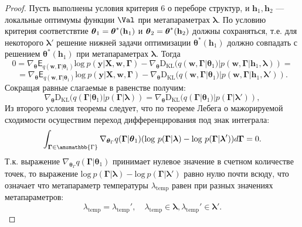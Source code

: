 \begin{proof}
Пусть выполнены условия критерия 6 о переборе структур, и $\mathbf{h}_1, \mathbf{h}_2$ --- локальные оптимумы функции $\Val$ при метапараметрах $\boldsymbol{\lambda}$.
По условию критерия соответствтие $\boldsymbol{\theta}_1 = \boldsymbol{\theta}^{*}(\mathbf{h}_1)$ и $\boldsymbol{\theta}_2 = \boldsymbol{\theta}^{*}(\mathbf{h}_2)$ должны сохраняться, т.е. для некоторого $\boldsymbol{\lambda}'$ решение  нижней задачи оптимизации $\boldsymbol{\theta}^{*}(\mathbf{h}_1)$ должно совпадать с решением $\boldsymbol{\theta}^{*}(\mathbf{h}_1)$ при метапараметрах $\boldsymbol{\lambda}$. Тогда
\[
  0 =  \nabla_{\boldsymbol{\theta}} \mathsf{E}_{q(\mathbf{w}, \boldsymbol{\Gamma}|\boldsymbol{\theta}_1)} \text{log}~p(\mathbf{y}|\mathbf{X}, \mathbf{w}, \boldsymbol{\Gamma}) -\nabla_{\boldsymbol{\theta}}  \text{D}_{\text{KL}}(q(\mathbf{w}, \boldsymbol{\Gamma}|\boldsymbol{\theta}_1) | p(\mathbf{w}, \boldsymbol{\Gamma}|\mathbf{h}_1, \boldsymbol{\lambda})) = 
\]
\[
= \nabla_{\boldsymbol{\theta}} \mathsf{E}_{q(\mathbf{w}, \boldsymbol{\Gamma}|\boldsymbol{\theta}_1)} \text{log}~p(\mathbf{y}|\mathbf{X}, \mathbf{w}, \boldsymbol{\Gamma}) - \nabla_{\boldsymbol{\theta}}  \text{D}_{\text{KL}}(q(\mathbf{w}, \boldsymbol{\Gamma}|\boldsymbol{\theta}_1) | p(\mathbf{w}, \boldsymbol{\Gamma}|\mathbf{h}_1, \boldsymbol{\lambda}')).
\]
Сокращая равные слагаемые в равенстве получим:
\[
\nabla_{\boldsymbol{\theta}}  \text{D}_{\text{KL}}(q(\boldsymbol{\Gamma}|\boldsymbol{\theta}_1) | p(\boldsymbol{\Gamma}| \boldsymbol{\lambda})) = \nabla_{\boldsymbol{\theta}} \text{D}_{\text{KL}}(q(\boldsymbol{\Gamma}|\boldsymbol{\theta}_1) | p(\boldsymbol{\Gamma}| \boldsymbol{\lambda}')),
\] 
Из второго условия теоремы следует, что по теореме Лебега о мажорируемой сходимости осуществим переход дифференцирования под знак интеграла:
\[
\int_{\boldsymbol{\Gamma} \in \amsmathbb{\Gamma}} \nabla_{\boldsymbol{\theta}_\Gamma} q(\boldsymbol{\Gamma}|\boldsymbol{\theta}_1) (\text{log}~p(\boldsymbol{\Gamma}| \boldsymbol{\lambda}) - \text{log}~p(\boldsymbol{\Gamma}| \boldsymbol{\lambda}')) d\boldsymbol{\Gamma} = 0.
\]
Т.к. выражение $ \nabla_{\boldsymbol{\theta}_\Gamma} q(\boldsymbol{\Gamma}|\boldsymbol{\theta}_1)$ принимает нулевое значение в счетном количестве точек, то выражение $\text{log}~p(\boldsymbol{\Gamma}| \boldsymbol{\lambda}) - \text{log}~p(\boldsymbol{\Gamma}| \boldsymbol{\lambda}')$ равно нулю почти всюду, что означает что метапараметр температуры $\lambda_\text{temp}$  равен при разных значениях метапараметров:
\[
\lambda_\text{temp} = \lambda_\text{temp}',\quad \lambda_\text{temp} \in \boldsymbol{\lambda}, \lambda_\text{temp}' \in \boldsymbol{\lambda}'.
\]
\end{proof}
